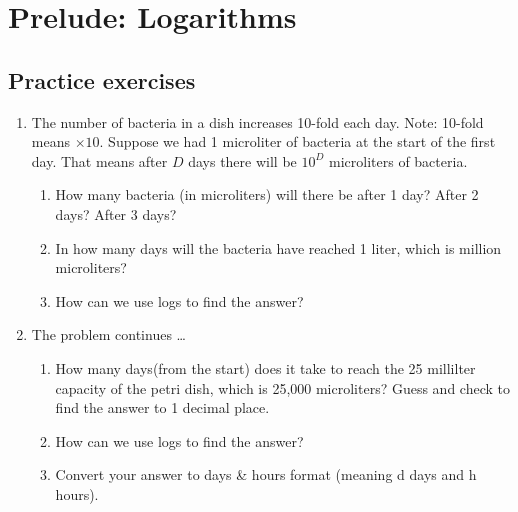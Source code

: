 
\section{Prelude: Logarithms} 

\subsection*{Practice exercises}

\begin{enumerate}

\item The number of bacteria in a dish increases 10-fold each day.   Note: 10-fold means $\times 10$.  Suppose we had 1 microliter of bacteria at the start of the first day.  That means after $D$ days there will be $10^D$ microliters of bacteria.
\begin{enumerate}
\item How many bacteria (in microliters) will there be after 1 day?  After 2 days? After 3 days?
\vfill
\item In how many days will the bacteria have reached 1 liter, which is million microliters?   \vfill
\item How can we use logs to find the answer?\vfill
\end{enumerate}

\item The problem continues \ldots
\begin{enumerate}
\item How many days(from the start) does it take to reach the 25 millilter capacity of the petri dish, which is 25,000 microliters?  Guess and check to find the answer to 1 decimal place. \vfill
\item How can we use logs to find the answer? \vfill
\item Convert your answer to days \& hours format (meaning d days and h hours). \vfill
\end{enumerate}



\end{enumerate}
